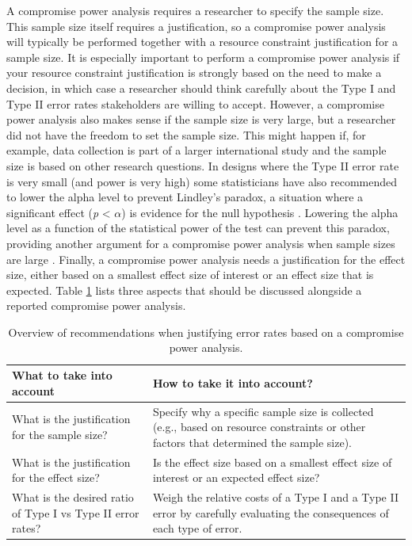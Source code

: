 \documentclass[
  oneside]{krantz}
\begin{document}
A compromise power analysis requires a researcher to specify the sample size. This sample size itself requires a justification, so a compromise power analysis will typically be performed together with a resource constraint justification for a sample size. It is especially important to perform a compromise power analysis if your resource constraint justification is strongly based on the need to make a decision, in which case a researcher should think carefully about the Type I and Type II error rates stakeholders are willing to accept. However, a compromise power analysis also makes sense if the sample size is very large, but a researcher did not have the freedom to set the sample size. This might happen if, for example, data collection is part of a larger international study and the sample size is based on other research questions. In designs where the Type II error rate is very small (and power is very high) some statisticians have also recommended to lower the alpha level to prevent Lindley's paradox, a situation where a significant effect (\emph{p} \textless{} \(\alpha\)) is evidence for the null hypothesis \citep{jeffreys_theory_1939, good_bayesnon-bayes_1992}. Lowering the alpha level as a function of the statistical power of the test can prevent this paradox, providing another argument for a compromise power analysis when sample sizes are large \citep{maier_justify_2022}. Finally, a compromise power analysis needs a justification for the effect size, either based on a smallest effect size of interest or an effect size that is expected. Table \ref{tab:table-compromise-just} lists three aspects that should be discussed alongside a reported compromise power analysis.

\begin{table}

\caption{\label{tab:table-compromise-just}Overview of recommendations when justifying error rates based on a compromise power analysis.}
\centering
\begin{tabular}[t]{>{\raggedright\arraybackslash}p{5cm}|>{\raggedright\arraybackslash}p{10cm}}
\hline
What to take into account & How to take it into account?\\
\hline
What is the justification for the sample size? & Specify why a specific sample size is collected (e.g., based on resource constraints or other factors that determined the sample size).\\
\hline
What is the justification for the effect size? & Is the effect size based on a smallest effect size of interest or an expected effect size?\\
\hline
What is the desired ratio of Type I vs Type II error rates? & Weigh the relative costs of a Type I and a Type II error by carefully evaluating the consequences of each type of error.\\
\hline
\end{tabular}
\end{table}
\end{document}
